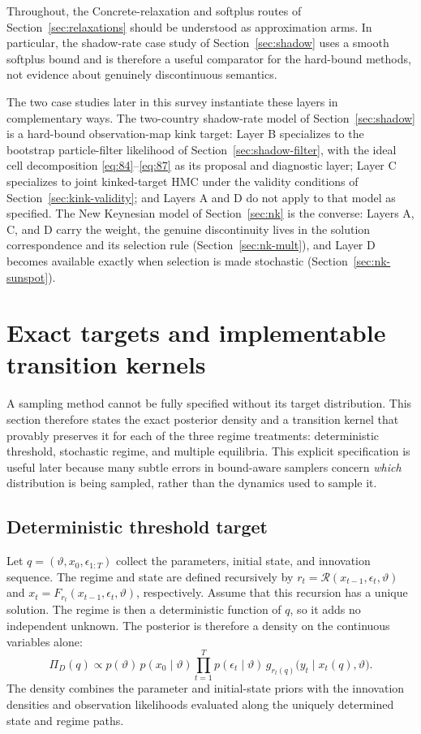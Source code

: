 \documentclass[11pt]{article}
\begin{document}
Throughout, the Concrete-relaxation and softplus routes of
Section~\ref{sec:relaxations} should be understood as approximation arms. In
particular, the shadow-rate case study of Section~\ref{sec:shadow} uses a smooth
softplus bound and is therefore a useful comparator for the hard-bound methods,
not evidence about genuinely discontinuous semantics.

The two case studies later in this survey instantiate these layers in
complementary ways. The two-country shadow-rate model of Section~\ref{sec:shadow} is a
hard-bound observation-map kink target: Layer B specializes to the bootstrap
particle-filter likelihood of Section~\ref{sec:shadow-filter}, with the ideal cell
decomposition \eqref{eq:84}--\eqref{eq:87} as its proposal and diagnostic
layer; Layer C specializes to joint kinked-target HMC under the validity
conditions of Section~\ref{sec:kink-validity}; and Layers A and D do not apply to that
model as specified. The New Keynesian model of Section~\ref{sec:nk} is the converse:
Layers A, C, and D carry the weight, the genuine discontinuity lives in the
solution correspondence and its selection rule (Section~\ref{sec:nk-mult}), and Layer D
becomes available exactly when selection is made stochastic
(Section~\ref{sec:nk-sunspot}).

\section{Exact targets and implementable transition kernels}\label{sec:targets}

A sampling method cannot be fully specified without its target distribution.
This section therefore states the exact posterior density and a transition
kernel that provably preserves it for each of the three regime treatments:
deterministic threshold, stochastic regime, and multiple equilibria. This
explicit specification is useful later because many subtle errors in
bound-aware samplers concern \emph{which} distribution is being sampled,
rather than the dynamics used to sample it.

\subsection{Deterministic threshold target}\label{sec:target-det}

Let $q=(\vartheta,x_0,\epsilon_{1:T})$ collect the parameters, initial state, and innovation
sequence. The regime and state are defined recursively by
$r_t=\mathcal R(x_{t-1},\epsilon_t,\vartheta)$ and
$x_t=F_{r_t}(x_{t-1},\epsilon_t,\vartheta)$, respectively. Assume that this recursion has a unique
solution. The regime is then a deterministic function of
$q$, so it adds no independent unknown. The posterior is therefore
a density on the continuous variables alone:
\begin{equation}\label{eq:71}
 \Pi_D(q)\propto p(\vartheta)\,p(x_0\mid\vartheta)
 \prod_{t=1}^T p(\epsilon_t\mid\vartheta)\,
 g_{r_t(q)}\bigl(y_t\mid x_t(q),\vartheta\bigr).
\end{equation}
The density combines the parameter and initial-state priors with the
innovation densities and observation likelihoods evaluated along the uniquely
determined state and regime paths.
\end{document}
